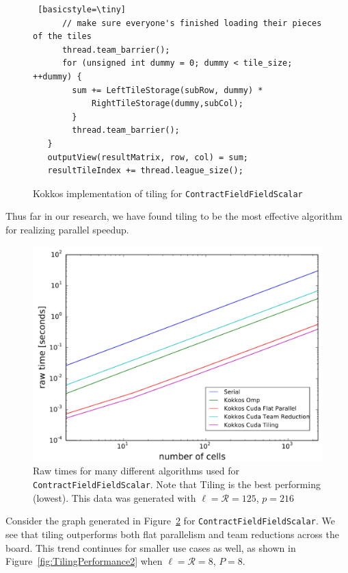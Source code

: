 \begin{figure}[H]
\begin{lstlisting} [basicstyle=\tiny]
      // make sure everyone's finished loading their pieces of the tiles
      thread.team_barrier();
      for (unsigned int dummy = 0; dummy < tile_size; ++dummy) {
        sum += LeftTileStorage(subRow, dummy) *
            RightTileStorage(dummy,subCol);
        }
        thread.team_barrier();
   }
   outputView(resultMatrix, row, col) = sum;
   resultTileIndex += thread.league_size();
 \end{lstlisting}
 \caption[\texttt{ContractFieldFieldScalar} tiling implementation]{Kokkos
     implementation of tiling for \texttt{ContractFieldFieldScalar}}
 \label{lst:ContractFieldFieldScalarTilingCode}
\end{figure}


Thus far in our research, we have found tiling to be the most effective
algorithm for realizing parallel speedup. 

\begin{figure}[H]
    \centering
\includegraphics[width=5in]{CFFS_RawTimes_LR125P216_2.PNG} 
\caption[\texttt{ContractFieldFieldScalar} performance summary (large)]{Raw times
    for many different algorithms used for \texttt{ContractFieldFieldScalar}.
    Note that Tiling is the best performing (lowest). This data was generated
    with
    $\ell=\mathcal{R}=125$, $p=216$}
\label{fig:TilingPerformance}
\end{figure}
Consider the graph generated in Figure~\ref{fig:TilingPerformance} for \texttt{ContractFieldFieldScalar}. We see that tiling outperforms both flat parallelism and team reductions across the board. This trend continues for smaller use cases as well, as shown in Figure~\ref{fig:TilingPerformance2} when $\ell = \mathcal{R} = 8$, $P = 8$.

